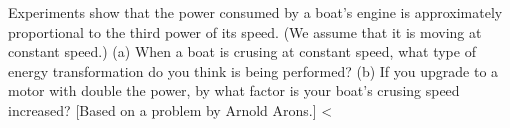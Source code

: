 Experiments show that the power consumed by a boat's
engine is approximately proportional to the third power of its
speed. (We assume that it is moving at constant speed.) (a)
When a boat is crusing at constant speed, what type of
energy transformation do you think is being performed? (b)
If you upgrade to a motor with double the power, by what
factor is your boat's crusing speed increased? [Based on a
problem by Arnold Arons.] <%
